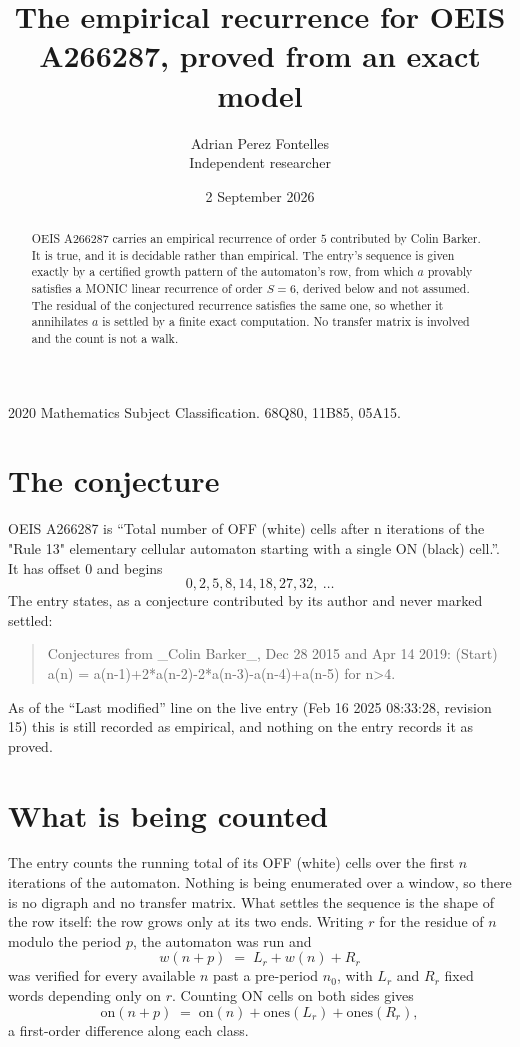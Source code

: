 \documentclass[11pt,a4paper]{article}
\title{The empirical recurrence for OEIS A266287, proved from an exact model}
\author{Adrian Perez Fontelles\\ \small Independent researcher}
\date{2 September 2026}
\theoremstyle{plain}
\theoremstyle{definition}
\begin{document}
\maketitle

\begin{abstract}
OEIS A266287 carries an empirical recurrence of order $5$ contributed by Colin Barker. It is true, and it is
decidable rather than empirical. The entry's sequence is given exactly by a certified growth pattern of the automaton's row, from
which $a$ provably satisfies a MONIC linear recurrence of order $S=6$, derived below and not
assumed. The residual of the conjectured recurrence satisfies the same one, so whether it
annihilates $a$ is settled by a finite exact computation. No transfer matrix is involved and
the count is not a walk.
\end{abstract}

\noindent\small 2020 Mathematics Subject Classification. 68Q80, 11B85, 05A15.\normalsize

\section{The conjecture}

OEIS A266287 is ``Total number of OFF (white) cells after n iterations of the "Rule 13" elementary cellular automaton starting with a single ON (black) cell.''. It has offset $0$ and begins
\[
0, 2, 5, 8, 14, 18, 27, 32,\ \dots
\]
The entry states, as a conjecture contributed by its author and never marked settled:
\begin{quote}
Conjectures from \_Colin Barker\_, Dec 28 2015 and Apr 14 2019: (Start) a(n) = a(n-1)+2*a(n-2)-2*a(n-3)-a(n-4)+a(n-5) for n>4.
\end{quote}
As of the ``Last modified'' line on the live entry (Feb 16 2025 08:33:28, revision 15)
this is still recorded as empirical, and nothing on the entry records it as proved.

\section{What is being counted}

The entry counts the running total of its OFF (white) cells over the first $n$ iterations of the automaton. Nothing is being enumerated over a window, so there is
no digraph and no transfer matrix. What settles the sequence is the shape of the row itself:
the row grows only at its two ends. Writing
$r$ for the residue of $n$ modulo the period $p$, the automaton was run and
\[
w(n+p)\;=\;L_r + w(n) + R_r
\]
was verified for every available $n$ past a
pre-period $n_0$, with $L_r$ and $R_r$ fixed words depending only on $r$. Counting ON cells on
both sides gives
\[
\mathrm{on}(n+p)\;=\;\mathrm{on}(n)+\mathrm{ones}(L_r)+\mathrm{ones}(R_r),
\]
a first-order difference along each class.
\end{document}
